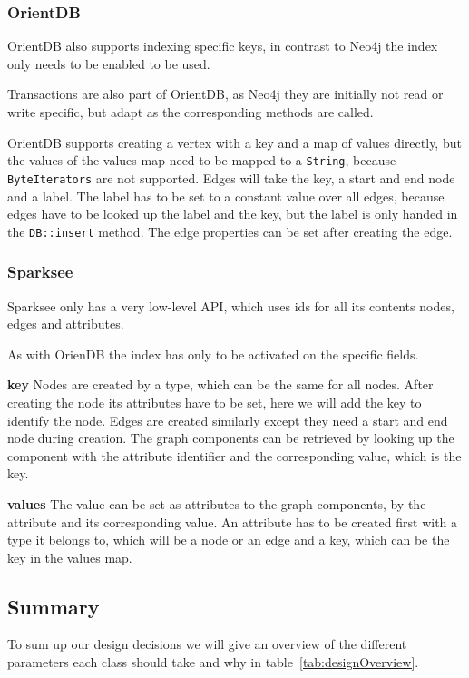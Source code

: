 \subsubsection{OrientDB}
OrientDB also supports indexing specific keys,
in contrast to Neo4j the index only needs to be enabled to be used.

Transactions are also part of OrientDB,
as Neo4j they are initially not read or write specific,
but adapt as the corresponding methods are called.

OrientDB supports creating a vertex with a key and a map of values directly, but the values of the values map need to be mapped to a \texttt{String},
because \texttt{ByteIterators} are not supported.
Edges will take the key, a start and end node and a label.
The label has to be set to a constant value over all edges,
because edges have to be looked up the label and the key,
but the label is only handed in the \texttt{DB::insert} method.
The edge properties can be set after creating the edge.

\subsubsection{Sparksee}
Sparksee only has a very low-level API,
which uses ids for all its contents nodes, edges and attributes.

As with OrienDB the index has only to be activated on the specific fields.

\textbf{key} \newline
Nodes are created by a type,
which can be the same for all nodes.
After creating the node its attributes have to be set,
here we will add the key to identify the node.
Edges are created similarly except they need a start and end node during creation.
The graph components can be retrieved by looking up the component with the attribute identifier and the corresponding value,
which is the key.

\textbf{values} \newline
The value can be set as attributes to the graph components,
by the attribute and its corresponding value.
An attribute has to be created first with a type it belongs to,
which will be a node or an edge and a key,
which can be the key in the values map.

\subsection{Summary}
\label{ch:design:se:summary}
To sum up our design decisions we will give an overview of the different parameters each class should take and why in table~\ref{tab:designOverview}.

